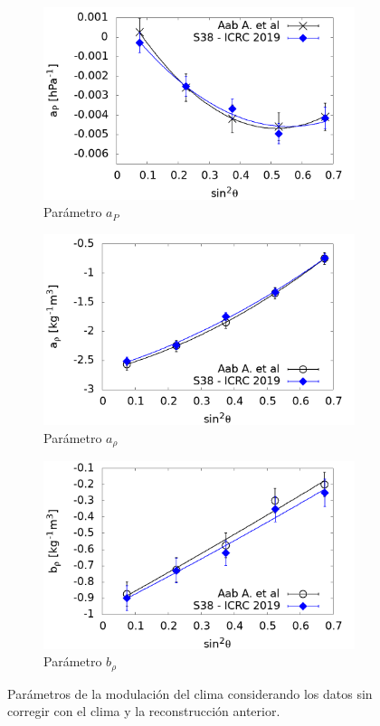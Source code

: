 				\begin{figure}[H]
    				\begin{subfigure}[b]{0.5\textwidth}
    				\includegraphics[width=\linewidth]{../clima/Graphs/params/ap_ICRC_2019_S38_above_0EeV.png}
					\caption{Parámetro $a_P$ }
					\label{fig:ap_2019_S38}
    				\end{subfigure}%
    				\hspace{\fill}
    				\begin{subfigure}[b]{0.5\textwidth}
    				\includegraphics[width=\linewidth]{../clima/Graphs/params/arho_ICRC_2019_S38_above_0EeV.png}
					\caption{Parámetro $a_{\rho}$ }
					\label{fig:arho_2019_S38}
    				\end{subfigure}%
    				\hspace{\fill}
    				\begin{subfigure}[b]{\textwidth}
    				\centering
    				\includegraphics[width=0.5\linewidth]{../clima/Graphs/params/brho_ICRC_2019_S38_above_0EeV.png}
					\caption{Parámetro  $b_{\rho}$	 }
					\label{fig:brho_2019_S38}
    				\end{subfigure}%
    				\caption{Parámetros de la modulación del clima considerando los datos sin corregir con el clima y la reconstrucción anterior.}\label{fig:parameters_new_S38}
				\end{figure}
